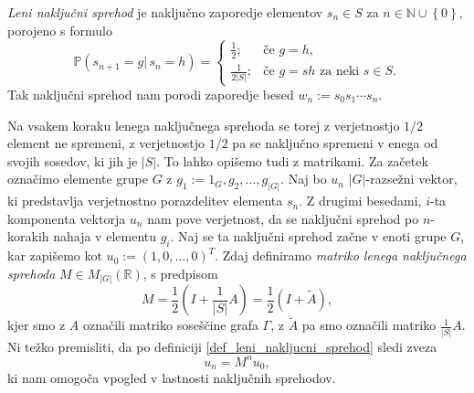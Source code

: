 \begin{definicija}
\label{def_leni_nakljucni_sprehod}
    \emph{Leni naključni sprehod} je naključno zaporedje elementov $s_n \in S$ za $n \in \mathbb{N} \cup \left\{ 0\right\} $, porojeno s formulo \begin{equation*}
        \mathbb{P}(s_{n+1} = g   \vert \,  s_n = h) = \begin{cases}
            \frac{1}{2}; & \text{če }  g = h, \\
            \frac{1}{2 \lvert S \rvert }; & \text{če } g = sh \text{ za neki } s \in S.
        \end{cases}
    \end{equation*}
    Tak naključni sprehod nam porodi zaporedje besed $w_n := s_0 s_1 \cdots s_n$.  
\end{definicija}
Na vsakem koraku lenega naključnega sprehoda se torej z verjetnostjo $1 / 2$ element ne spremeni, z verjetnostjo $1 / 2$ pa se naključno spremeni v enega od svojih sosedov, ki jih je $\lvert S \rvert$.
To lahko opišemo tudi z matrikami. Za začetek označimo elemente grupe $G$ z $g_1 := 1_G, g_2 , \ldots, g_{\lvert G \rvert}$. Naj bo $u_n$ $\lvert G \rvert$-razsežni vektor, ki predstavlja verjetnostno porazdelitev elementa $s_n$. Z drugimi besedami, $i$-ta komponenta vektorja $u_n$ nam pove verjetnost, da se naključni sprehod po $n$-korakih nahaja v elementu $g_i$. Naj se ta naključni sprehod začne v enoti grupe $G$, kar zapišemo kot $u_0 := (1, 0, \ldots , 0)^T$. 
Zdaj definiramo \emph{matriko lenega naključnega sprehoda} $M \in M_{\lvert G \rvert }(\mathbb{R})$, s predpisom    
\begin{equation*}
M = \frac{1}{2} \left(I + \frac{1}{\lvert S \rvert } A \right) = \frac{1}{2} \left(I + \tilde{A} \right),
\end{equation*}  
kjer smo z $A$ označili matriko soseščine grafa $\Gamma$, z $\tilde{A}$ pa smo označili matriko $\frac{1}{\lvert S \rvert} A$. Ni težko premisliti, da po definiciji \ref{def_leni_nakljucni_sprehod} sledi zveza 
\begin{equation*}
u_n = M^{n} u_0,
\end{equation*}  
ki nam omogoča vpogled v lastnosti naključnih sprehodov. 

